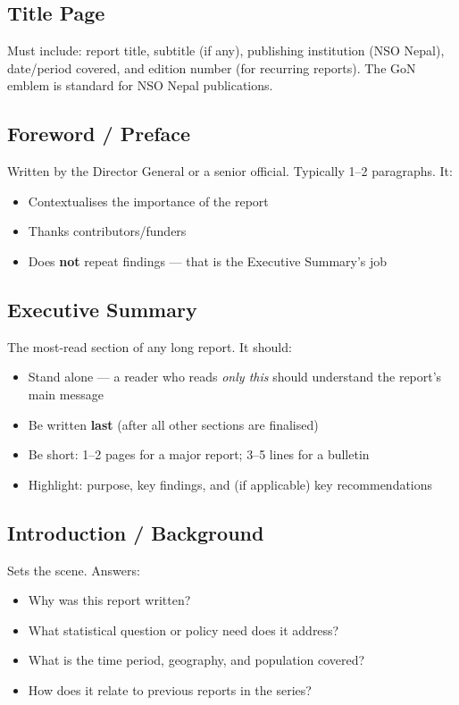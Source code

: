 \documentclass[11pt,a4paper,oneside]{book}
\begin{document}
\subsection*{Title Page}
Must include: report title, subtitle (if any), publishing institution (NSO Nepal), date/period covered, and edition number (for recurring reports). The GoN emblem is standard for NSO Nepal publications.

\subsection*{Foreword / Preface}
Written by the Director General or a senior official. Typically 1--2 paragraphs. It:
\begin{itemize}
    \item Contextualises the importance of the report
    \item Thanks contributors/funders
    \item Does \textbf{not} repeat findings --- that is the Executive Summary's job
\end{itemize}

\subsection*{Executive Summary}
The most-read section of any long report. It should:
\begin{itemize}
    \item Stand alone --- a reader who reads \emph{only this} should understand the report's main message
    \item Be written \textbf{last} (after all other sections are finalised)
    \item Be short: 1--2 pages for a major report; 3--5 lines for a bulletin
    \item Highlight: purpose, key findings, and (if applicable) key recommendations
\end{itemize}

\subsection*{Introduction / Background}
Sets the scene. Answers:
\begin{itemize}
    \item Why was this report written?
    \item What statistical question or policy need does it address?
    \item What is the time period, geography, and population covered?
    \item How does it relate to previous reports in the series?
\end{itemize}
\end{document}
